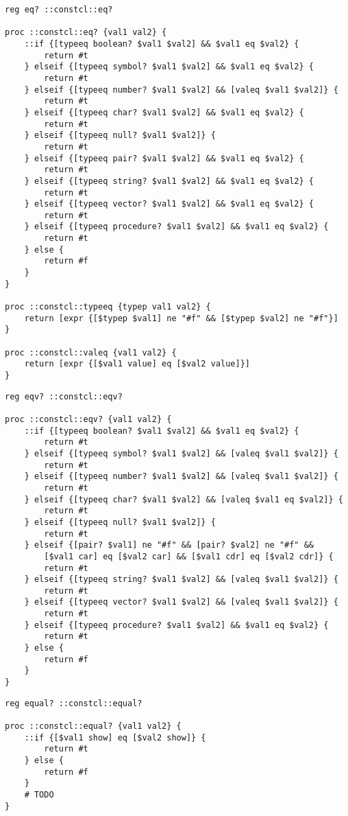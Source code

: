 \documentclass{report}
\begin{document}
\noindent\makebox[\linewidth]{\rule{\linewidth}{0.4pt}}
\begin{lstlisting}
reg eq? ::constcl::eq?
 
proc ::constcl::eq? {val1 val2} {
    ::if {[typeeq boolean? $val1 $val2] && $val1 eq $val2} {
        return #t
    } elseif {[typeeq symbol? $val1 $val2] && $val1 eq $val2} {
        return #t
    } elseif {[typeeq number? $val1 $val2] && [valeq $val1 $val2]} {
        return #t
    } elseif {[typeeq char? $val1 $val2] && $val1 eq $val2} {
        return #t
    } elseif {[typeeq null? $val1 $val2]} {
        return #t
    } elseif {[typeeq pair? $val1 $val2] && $val1 eq $val2} {
        return #t
    } elseif {[typeeq string? $val1 $val2] && $val1 eq $val2} {
        return #t
    } elseif {[typeeq vector? $val1 $val2] && $val1 eq $val2} {
        return #t
    } elseif {[typeeq procedure? $val1 $val2] && $val1 eq $val2} {
        return #t
    } else {
        return #f
    }
}
 
proc ::constcl::typeeq {typep val1 val2} {
    return [expr {[$typep $val1] ne "#f" && [$typep $val2] ne "#f"}]
}
 
proc ::constcl::valeq {val1 val2} {
    return [expr {[$val1 value] eq [$val2 value]}]
}
\end{lstlisting}
\noindent\makebox[\linewidth]{\rule{\linewidth}{0.4pt}}
\noindent\makebox[\linewidth]{\rule{\linewidth}{0.4pt}}
\begin{lstlisting}
reg eqv? ::constcl::eqv?
 
proc ::constcl::eqv? {val1 val2} {
    ::if {[typeeq boolean? $val1 $val2] && $val1 eq $val2} {
        return #t
    } elseif {[typeeq symbol? $val1 $val2] && [valeq $val1 $val2]} {
        return #t
    } elseif {[typeeq number? $val1 $val2] && [valeq $val1 $val2]} {
        return #t
    } elseif {[typeeq char? $val1 $val2] && [valeq $val1 eq $val2]} {
        return #t
    } elseif {[typeeq null? $val1 $val2]} {
        return #t
    } elseif {[pair? $val1] ne "#f" && [pair? $val2] ne "#f" &&
        [$val1 car] eq [$val2 car] && [$val1 cdr] eq [$val2 cdr]} {
        return #t
    } elseif {[typeeq string? $val1 $val2] && [valeq $val1 $val2]} {
        return #t
    } elseif {[typeeq vector? $val1 $val2] && [valeq $val1 $val2]} {
        return #t
    } elseif {[typeeq procedure? $val1 $val2] && $val1 eq $val2} {
        return #t
    } else {
        return #f
    }
}
\end{lstlisting}
\noindent\makebox[\linewidth]{\rule{\linewidth}{0.4pt}}
\noindent\makebox[\linewidth]{\rule{\linewidth}{0.4pt}}
\begin{lstlisting}
reg equal? ::constcl::equal?
 
proc ::constcl::equal? {val1 val2} {
    ::if {[$val1 show] eq [$val2 show]} {
        return #t
    } else {
        return #f
    }
    # TODO
}
\end{lstlisting}
\noindent\makebox[\linewidth]{\rule{\linewidth}{0.4pt}}
\end{document}
